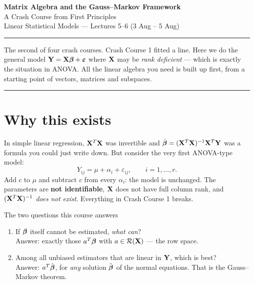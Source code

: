 \documentclass[11pt]{article}
\begin{document}
\begin{center}
{\LARGE\bfseries Matrix Algebra and the Gauss--Markov Framework}\\[4pt]
{\large A Crash Course from First Principles}\\[3pt]
{\small Linear Statistical Models --- Lectures 5--6 (3 Aug -- 5 Aug)}
\end{center}
\vspace{2pt}\hrule\vspace{10pt}

\noindent The second of four crash courses. Crash Course 1 fitted a line. Here we do the
general model $\mathbf{Y}=\mathbf{X}\boldsymbol{\beta}+\boldsymbol{\varepsilon}$ where $\mathbf{X}$ may be \emph{rank deficient} --- which is
exactly the situation in ANOVA. All the linear algebra you need is built up first, from a
starting point of vectors, matrices and subspaces.

\tableofcontents
\vspace{8pt}\hrule\vspace{10pt}

\section{Why this exists}

In simple linear regression, $\mathbf{X}^T\mathbf{X}$ was invertible and $\hat{\boldsymbol{\beta}}=(\mathbf{X}^T\mathbf{X})^{-1}\mathbf{X}^T\mathbf{Y}$
was a formula you could just write down. But consider the very first ANOVA-type model:
\[
  Y_{ij}=\mu+\alpha_i+\varepsilon_{ij},\qquad i=1,\dots,r .
\]
Add $c$ to $\mu$ and subtract $c$ from every $\alpha_i$: the model is unchanged. The
parameters are \textbf{not identifiable}, $\mathbf{X}$ does not have full column rank, and
$(\mathbf{X}^T\mathbf{X})^{-1}$ \emph{does not exist}. Everything in Crash Course 1 breaks.

\begin{idea}{The two questions this course answers}
\begin{enumerate}
  \item If $\boldsymbol{\beta}$ itself cannot be estimated, \emph{what can}? \\
        Answer: exactly those $a^T\boldsymbol{\beta}$ with $a\in \mathcal{R}(\mathbf{X})$ --- the row space.
  \item Among all unbiased estimators that are linear in $\mathbf{Y}$, which is best? \\
        Answer: $a^T\hat{\boldsymbol{\beta}}$, for \emph{any} solution $\hat{\boldsymbol{\beta}}$ of the normal equations.
        That is the Gauss--Markov theorem.
\end{enumerate}
\end{idea}
\end{document}

